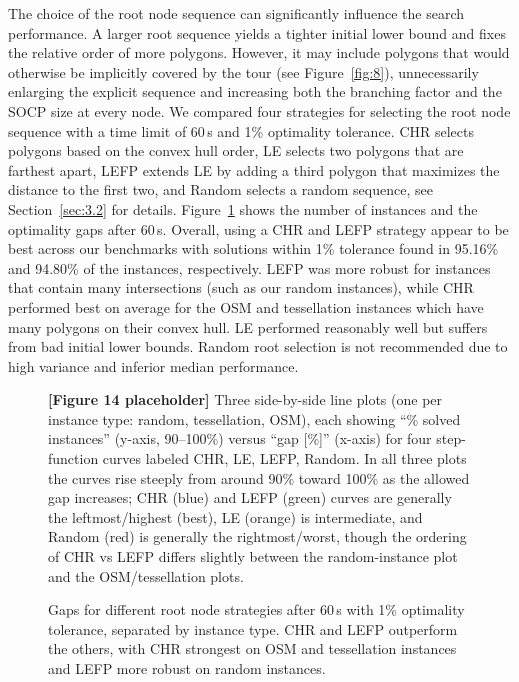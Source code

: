 \documentclass[11pt,a4paper]{article}
\theoremstyle{plain}
\begin{document}
The choice of the root node sequence can significantly influence the search performance. A larger root sequence yields a tighter initial lower bound and fixes the relative order of more polygons. However, it may include polygons that would otherwise be implicitly covered by the tour (see Figure~\ref{fig:8}), unnecessarily enlarging the explicit sequence and increasing both the branching factor and the SOCP size at every node. We compared four strategies for selecting the root node sequence with a time limit of 60\,s and 1\% optimality tolerance. CHR selects polygons based on the convex hull order, LE selects two polygons that are farthest apart, LEFP extends LE by adding a third polygon that maximizes the distance to the first two, and Random selects a random sequence, see Section~\ref{sec:3.2} for details. Figure~\ref{fig:14} shows the number of instances and the optimality gaps after 60\,s. Overall, using a CHR and LEFP strategy appear to be best across our benchmarks with solutions within 1\% tolerance found in 95.16\% and 94.80\% of the instances, respectively. LEFP was more robust for instances that contain many intersections (such as our random instances), while CHR performed best on average for the OSM and tessellation instances which have many polygons on their convex hull. LE performed reasonably well but suffers from bad initial lower bounds. Random root selection is not recommended due to high variance and inferior median performance.

\begin{figure}[h]
\centering
\begin{figplaceholder}
\textbf{[Figure 14 placeholder]} Three side-by-side line plots (one per instance type: random, tessellation, OSM), each showing ``\% solved instances'' (y-axis, 90--100\%) versus ``gap [\%]'' (x-axis) for four step-function curves labeled CHR, LE, LEFP, Random. In all three plots the curves rise steeply from around 90\% toward 100\% as the allowed gap increases; CHR (blue) and LEFP (green) curves are generally the leftmost/highest (best), LE (orange) is intermediate, and Random (red) is generally the rightmost/worst, though the ordering of CHR vs LEFP differs slightly between the random-instance plot and the OSM/tessellation plots.
\end{figplaceholder}
\caption{Gaps for different root node strategies after 60\,s with 1\% optimality tolerance, separated by instance type. CHR and LEFP outperform the others, with CHR strongest on OSM and tessellation instances and LEFP more robust on random instances.}
\label{fig:14}
\end{figure}
\end{document}
